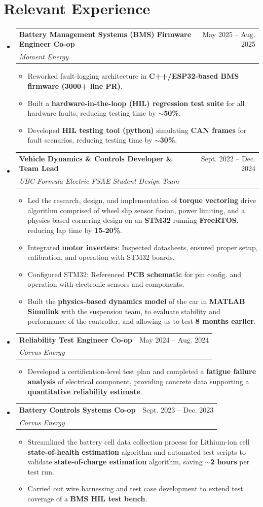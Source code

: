 \documentclass[letterpaper,11pt]{article}
\makeatletter
\newcommand{\resumeItem}[1]{
  \item\small{
    {#1 \vspace{-2pt}}
  }
}
\newcommand{\resumeSubheading}[4]{
  \vspace{-2pt}\item
    \begin{tabular*}{0.97\textwidth}[t]{l@{\extracolsep{\fill}}r}
      \textbf{#1} & #2 \\
      \textit{\small#3} & \textit{\small #4} \\
    \end{tabular*}\vspace{-7pt}
}
\newcommand{\resumeSubHeadingListStart}{\begin{itemize}[leftmargin=0in, label={}]}
\newcommand{\resumeSubHeadingListEnd}{\end{itemize}}
\newcommand{\resumeItemListStart}{\begin{itemize}}
\newcommand{\resumeItemListEnd}{\end{itemize}\vspace{-5pt}}
\makeatother
\begin{document}
\section{Relevant Experience}
  \resumeSubHeadingListStart
  \resumeSubheading
    {Battery Management Systems (BMS) Firmware Engineer Co-op}{May 2025 -- Aug. 2025}
    {Moment Energy}{}
    \resumeItemListStart
      \resumeItem{Reworked fault-logging architecture in \textbf{C++/ESP32-based BMS firmware (3000+ line PR)}.}
      \resumeItem{Built a \textbf{hardware-in-the-loop (HIL) regression test suite} for all hardware faults, reducing testing time by \textbf{$\sim$50\%}.}
      \resumeItem{Developed \textbf{HIL testing tool (python)} simulating \textbf{CAN frames} for fault scenarios, reducing testing time by \textbf{$\sim$30\%}.}
    \resumeItemListEnd
\vspace{1mm}
  \resumeSubheading
      {Vehicle Dynamics \& Controls Developer \& Team Lead}{Sept. 2022 -- Dec. 2024}
      {UBC Formula Electric FSAE Student Design Team}{}
      \resumeItemListStart
        \resumeItem{Led the research, design, and implementation of \textbf{torque vectoring} drive algorithm comprised of wheel slip sensor fusion, power limiting, and a physics-based cornering design on an \textbf{STM32} running \textbf{FreeRTOS}, reducing lap time by \textbf{15-20\%}.}
        \resumeItem{Integrated \textbf{motor inverters}: Inspected datasheets, ensured proper setup, calibration, and operation with STM32 boards.}
        \resumeItem{Configured STM32: Referenced \textbf{PCB schematic} for pin config. and operation with electronic sensors and components.}
        \resumeItem{Built the \textbf{physics-based dynamics model} of the car in \textbf{MATLAB Simulink} with the suspension team, to evaluate stability and performance of the controller, and allowing us to test \textbf{8 months earlier}.}
      \resumeItemListEnd
\vspace{1mm}
    \resumeSubheading
      {Reliability Test Engineer Co-op}{May 2024 -- Aug. 2024}
      {Corvus Energy}{}
      \resumeItemListStart
         \resumeItem{Developed a certification-level test plan and completed a \textbf{fatigue failure analysis} of electrical component, providing concrete data supporting a \textbf{quantitative reliability estimate}.}
      \resumeItemListEnd
\vspace{1mm}
    \resumeSubheading
      {Battery Controls Systems Co-op}{Sept. 2023 -- Dec. 2023}
      {Corvus Energy}{}
      \resumeItemListStart
        \resumeItem{Streamlined the battery cell data collection process for Lithium-ion cell \textbf{state-of-health estimation} algorithm and automated test scripts to validate \textbf{state-of-charge estimation} algorithm, saving \textbf{$\sim$2 hours} per test run.}
        \resumeItem{Carried out wire harnessing and test case development to extend test coverage of a \textbf{BMS HIL test bench}.}
      \resumeItemListEnd
\vspace{1mm}
  \resumeSubHeadingListEnd
\end{document}
